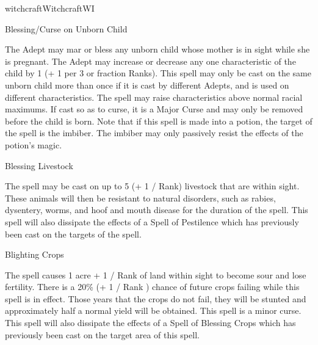 \begin{college}[1.1]{witchcraft}{Witchcraft}{WI}
\begin{spell}[S-2]{Blessing/Curse on Unborn Child}
\begin{effects}
The Adept may mar or bless any unborn child whose mother is in sight
while she is pregnant.  The Adept may increase or decrease any one
characteristic of the child by 1 (+ 1 per 3 or fraction Ranks).  This
spell may only be cast on the same unborn child more than once if it
is cast by different Adepts, and is used on different characteristics.
The spell may raise characteristics above normal racial maximums.  If
cast so as to curse, it is a Major Curse and may only be removed
before the child is born.  Note that if this spell is made into a
potion, the target of the spell is the imbiber.  The imbiber may only
passively resist the effects of the potion's magic.
\end{effects}
\end{spell}

\begin{spell}[S-3]{Blessing Livestock}

\begin{effects}
The spell may be cast on up to 5 (+ 1 / Rank) livestock that are
within sight.  These animals will then be resistant to natural
disorders, such as rabies, dysentery, worms, and hoof and mouth
disease for the duration of the spell.  This spell will also dissipate
the effects of a Spell of Pestilence which has previously been cast on
the targets of the spell.
\end{effects}
\end{spell}

\begin{spell}[S-4]{Blighting Crops}

\begin{effects}
The spell causes 1 acre + 1 / Rank of land within sight to become sour
and lose fertility.  There is a 20\% (+ 1 / Rank ) chance of future
crops failing while this spell is in effect.  Those years that the
crops do not fail, they will be stunted and approximately half a
normal yield will be obtained.  This spell is a minor curse.  This
spell will also dissipate the effects of a Spell of Blessing Crops
which has previously been cast on the target area of this spell.
\end{effects}
\end{spell}


\end{college}
